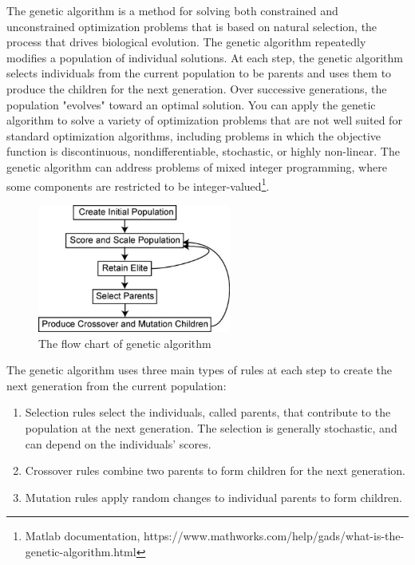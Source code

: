 \documentclass[a4paper]{tufte-handout} %
\begin{document}
The genetic algorithm is a method for solving both constrained and unconstrained optimization problems that is based on natural selection, the process that drives biological evolution. The genetic algorithm repeatedly modifies a population of individual solutions. At each step, the genetic algorithm selects individuals from the current population to be parents and uses them to produce the children for the next generation. Over successive generations, the population "evolves" toward an optimal solution. You can apply the genetic algorithm to solve a variety of optimization problems that are not well suited for standard optimization algorithms, including problems in which the objective function is discontinuous, nondifferentiable, stochastic, or highly non-linear. The genetic algorithm can address problems of mixed integer programming, where some components are restricted to be integer-valued\footnote{Matlab documentation, https://www.mathworks.com/help/gads/what-is-the-genetic-algorithm.html}.
\begin{figure}[h]
    \centering
	\includegraphics[width=2.5in]{Image/GeneticAlgorithmChart.png}
	\caption{The flow chart of genetic algorithm}
	\label{fig:textfig}
\end{figure}

The genetic algorithm uses three main types of rules at each step to create the next generation from the current population:
\begin{enumerate}
    \item Selection rules select the individuals, called parents, that contribute to the population at the next generation. The selection is generally stochastic, and can depend on the individuals' scores.
    \item Crossover rules combine two parents to form children for the next generation.
    \item Mutation rules apply random changes to individual parents to form children.
\end{enumerate}
\end{document}
